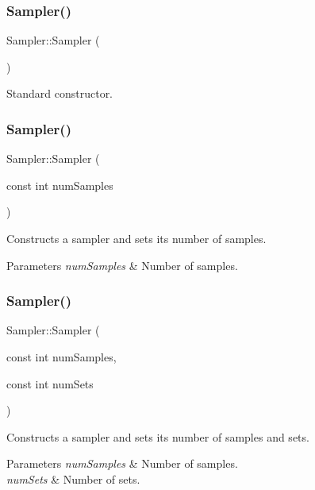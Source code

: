 \subsubsection{\texorpdfstring{Sampler()}{Sampler()}\hspace{0.1cm}{\footnotesize\ttfamily [1/3]}}
{\footnotesize\ttfamily Sampler\+::\+Sampler (\begin{DoxyParamCaption}{ }\end{DoxyParamCaption})}

Standard constructor. \hypertarget{class_sampler_a8dfadf2352d0c2518c73e54d0b00de39}{}\label{class_sampler_a8dfadf2352d0c2518c73e54d0b00de39} 
\subsubsection{\texorpdfstring{Sampler()}{Sampler()}\hspace{0.1cm}{\footnotesize\ttfamily [2/3]}}
{\footnotesize\ttfamily Sampler\+::\+Sampler (\begin{DoxyParamCaption}\item[{const int}]{num\+Samples }\end{DoxyParamCaption})}

Constructs a sampler and sets its number of samples. 
\begin{DoxyParams}{Parameters}
{\em num\+Samples} & Number of samples. \\
\hline
\end{DoxyParams}
\hypertarget{class_sampler_ab3d3ec7bbf6be9d8199023d0ad2ec23b}{}\label{class_sampler_ab3d3ec7bbf6be9d8199023d0ad2ec23b} 
\subsubsection{\texorpdfstring{Sampler()}{Sampler()}\hspace{0.1cm}{\footnotesize\ttfamily [3/3]}}
{\footnotesize\ttfamily Sampler\+::\+Sampler (\begin{DoxyParamCaption}\item[{const int}]{num\+Samples,  }\item[{const int}]{num\+Sets }\end{DoxyParamCaption})}

Constructs a sampler and sets its number of samples and sets. 
\begin{DoxyParams}{Parameters}
{\em num\+Samples} & Number of samples. \\
\hline
{\em num\+Sets} & Number of sets. \\
\hline
\end{DoxyParams}


